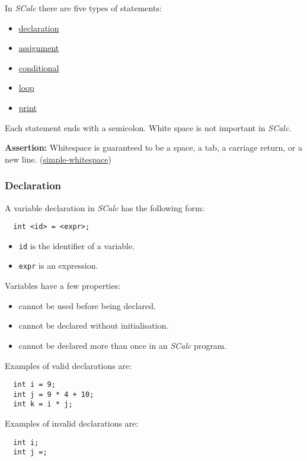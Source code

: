 \documentclass{article}
\newcommand{\code}[1]{\texttt{\textmd{#1}}}
\newcommand{\assertion}[2]{\textbf{Assertion: }#1 (\hyperlink{#2}{#2})}
\begin{document}
In \textit{SCalc} there are five types of statements:

\begin{itemize}
  \item \hyperref[sssec:declaration]{declaration}
  \item \hyperref[sssec:assignment]{assignment}
  \item \hyperref[sssec:conditional]{conditional}
  \item \hyperref[sssec:loop]{loop}
  \item \hyperref[sssec:print]{print}
\end{itemize}

Each statement ends with a semicolon. White space is not important in \textit{SCalc}.

\assertion{Whitespace is guaranteed to be a space, a tab, a carriage return, or a new
line.}{simple-whitespace}

\subsubsection{Declaration}
\label{sssec:declaration}
A variable declaration in \textit{SCalc} has the following form:
\begin{lstlisting}
  int <id> = <expr>;
\end{lstlisting}

\begin{itemize}
  \item \code{id} is the identifier of a variable.
  \item \code{expr} is an expression.
\end{itemize}

Variables have a few properties:\hypertarget{variable-props}{}
\begin{itemize}
  \item cannot be used before being declared.
  \item cannot be declared without initialisation.
  \item cannot be declared more than once in an \textit{SCalc} program.
\end{itemize}

Examples of valid declarations are:
\begin{lstlisting}
  int i = 9;
  int j = 9 * 4 + 10;
  int k = i * j;
\end{lstlisting}

Examples of invalid declarations are:
\begin{lstlisting}
  int i;
  int j =;
\end{lstlisting}
\end{document}
